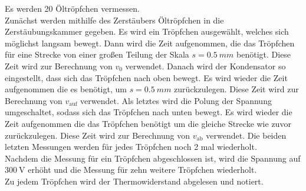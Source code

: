 Es werden 20 Öltröpfchen vermessen.\\
Zunächst werden mithilfe des Zerstäubers Öltröpfchen in die Zerstäubungskammer gegeben.
Es wird ein Tröpfchen ausgewählt, welches sich möglichst langsam bewegt.
Dann wird die Zeit aufgenommen, die das Tröpfchen für eine Strecke von einer großen Teilung der Skala $s = \SI{0.5}{mm}$ benötigt.
Diese Zeit wird zur Berechnung von $v_0$ verwendet. 
Danach wird der Kondensator so eingestellt, dass sich das Tröpfchen nach oben bewegt.
Es wird wieder die Zeit aufgenommen die es benötigt, um $s = \SI{0.5}{mm}$ zurückzulegen.
Diese Zeit wird zur Berechnung von $v_\text{auf}$ verwendet.
Als letztes wird die Polung der Spannung umgeschaltet, sodass sich das Tröpfchen nach unten bewegt.
Es wird wieder die Zeit aufgenommen die das Tröpfchen benötigt um die gleiche Strecke wie zuvor zurückzulegen.
Diese Zeit wird zur Berechnung von $v_\text{ab}$ verwendet.
Die beiden letzten Messungen werden für jedes Tröpfchen noch 2 mal wiederholt.
\\
Nachdem die Messung für ein Tröpfchen abgeschlossen ist, wird die Spannung auf $\SI{300}{\volt}$ erhöht und die Messung für zehn weitere Tröpfchen wiederholt.
\\
Zu jedem Tröpfchen wird der Thermowiderstand abgelesen und notiert.\\

\newpage